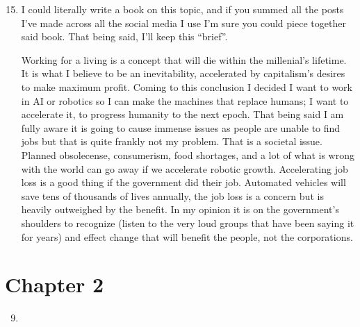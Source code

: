 \documentclass[letterpaper,10pt,english]{sphinxmanual}
\begin{document}
\begin{enumerate}
\setcounter{enumi}{14}
\item {} 

I could literally write a book on this topic, and if you summed all the posts I’ve made across all the social media I use I’m sure you could piece together said book. That being said, I’ll keep this “brief”.

Working for a living is a concept that will die within the millenial’s lifetime. It is what I believe to be an inevitability, accelerated by capitalism’s desires to make maximum profit. Coming to this conclusion I decided I want to work in AI or robotics so I can make the machines that replace humans; I want to accelerate it, to progress humanity to the next epoch. That being said I am fully aware it is going to cause immense issues as people are unable to find jobs but that is quite frankly not my problem. That is a societal issue. Planned obsolecense, consumerism, food shortages, and a lot of what is wrong with the world can go away if we accelerate robotic growth. Accelerating job loss is a good thing if the government did their job. Automated vehicles will save tens of thousands of lives annually, the job loss is a concern but is heavily outweighed by the benefit. In my opinion it is on the government’s shoulders to recognize (listen to the very loud groups that have been saying it for years) and effect change that will benefit the people, not the corporations.

\end{enumerate}


\section{Chapter 2}
\label{\detokenize{index:chapter-2}}\begin{enumerate}
\setcounter{enumi}{8}
\item {} 
\end{enumerate}
\end{document}
